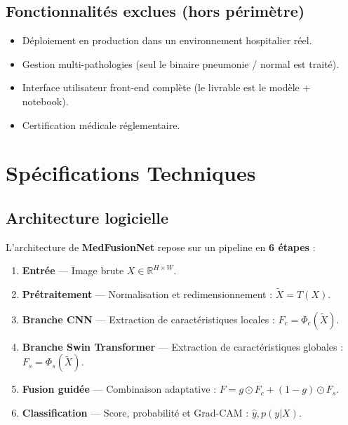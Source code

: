 \documentclass[a4paper,12pt]{article}
\begin{document}
\subsection{Fonctionnalités exclues (hors périmètre)}

\begin{itemize}[leftmargin=1.5em, itemsep=3pt]
  \item Déploiement en production dans un environnement hospitalier réel.
  \item Gestion multi-pathologies (seul le binaire pneumonie / normal est traité).
  \item Interface utilisateur front-end complète (le livrable est le modèle + notebook).
  \item Certification médicale réglementaire.
\end{itemize}

\newpage
\section{Spécifications Techniques}

\subsection{Architecture logicielle}

L'architecture de \textbf{MedFusionNet} repose sur un pipeline en \textbf{6 étapes} :

\begin{enumerate}[leftmargin=1.5em, itemsep=2pt]
  \item \textbf{Entrée} — Image brute $X \in \mathbb{R}^{H \times W}$.
  \item \textbf{Prétraitement} — Normalisation et redimensionnement : $\tilde{X} = T(X)$.
  \item \textbf{Branche CNN} — Extraction de caractéristiques locales : $F_c = \Phi_c(\tilde{X})$.
  \item \textbf{Branche Swin Transformer} — Extraction de caractéristiques globales : $F_s = \Phi_s(\tilde{X})$.
  \item \textbf{Fusion guidée} — Combinaison adaptative : $F = g \odot F_c + (1-g) \odot F_s$.
  \item \textbf{Classification} — Score, probabilité et Grad-CAM : $\hat{y}, p(y|X)$.
\end{enumerate}
\end{document}
